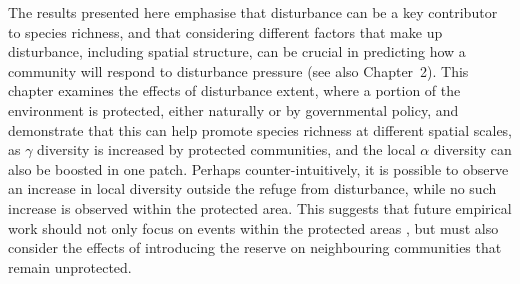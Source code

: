  The results presented here emphasise that disturbance can be a key contributor to species richness, and that considering different factors that make up disturbance, including spatial structure, can be crucial in predicting how a community will respond to disturbance pressure (see also Chapter~2). This chapter examines the effects of disturbance extent, where a portion of the environment is protected, either naturally or by governmental policy, and demonstrate that this can help promote species richness at different spatial scales, as $\gamma$ diversity is increased by protected communities, and the local $\alpha$ diversity can also be boosted in one patch. Perhaps counter-intuitively, it is possible to observe an increase in local diversity outside the refuge from disturbance, while no such increase is observed within the protected area. This suggests that  future empirical work should not only focus on events within the protected areas \citep[e.g.][]{pyvsek2002plant,kitchner1982predictors}, but must also consider the effects of introducing the reserve on neighbouring communities that remain unprotected.
 